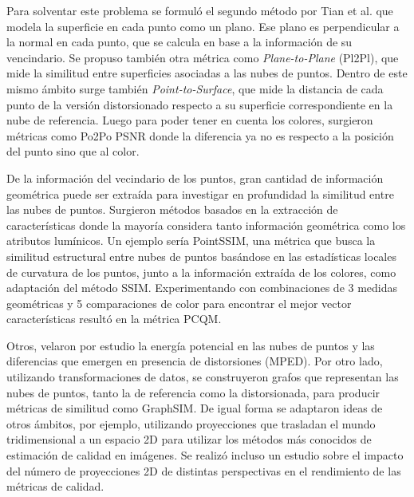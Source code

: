 Para solventar este problema se formuló el segundo método por Tian et al. 
que modela la superficie en cada punto como un plano. 
Ese plano es perpendicular a la normal en cada punto, que se calcula en base a la información de su vencindario. 
Se propuso también otra métrica como \emph{Plane-to-Plane} (Pl2Pl)\cite{PlaneToPlane}, 
que mide la similitud entre superficies asociadas a las nubes de puntos. Dentro 
de este mismo ámbito surge también \emph{Point-to-Surface}\cite{PlaneToSurface}, 
que mide la distancia de cada punto de la versión distorsionado respecto a su 
superficie correspondiente en la nube de referencia. Luego para poder tener en
cuenta los colores, surgieron métricas como Po2Po PSNR donde la diferencia 
ya no es respecto a la posición del punto sino que al color.

De la información del vecindario de los puntos, gran cantidad de información geométrica 
puede ser extraída para investigar en profundidad la similitud entre las nubes 
de puntos. Surgieron métodos basados en la extracción de características donde la 
mayoría considera tanto información geométrica como los atributos lumínicos.
Un ejemplo sería PointSSIM\cite{PointSSIM}, una métrica que busca la similitud estructural entre nubes de puntos basándose en
las estadísticas locales de curvatura de los puntos, junto a la información 
extraída de los colores, como adaptación del método SSIM\cite{SSIM}.
Experimentando con combinaciones de 3 medidas geométricas y 5 comparaciones de color 
para encontrar el mejor vector características resultó en la métrica PCQM\cite{PCQM}.

Otros, velaron por estudio la energía potencial en las nubes de puntos y 
las diferencias que emergen en presencia de distorsiones (MPED)\cite{MPED}.
Por otro lado, utilizando transformaciones de datos, se construyeron grafos que representan 
las nubes de puntos, tanto la de referencia como la distorsionada, 
para producir métricas de similitud como GraphSIM\cite{GraphSIM}.
De igual forma se adaptaron ideas de otros ámbitos, por ejemplo, utilizando 
proyecciones que trasladan el mundo tridimensional a un espacio 2D para utilizar 
los métodos más conocidos de estimación de calidad en imágenes.
Se realizó incluso un estudio sobre el impacto del número de proyecciones 2D de 
distintas perspectivas en el rendimiento de las métricas de calidad\cite{ImpactOf2DProyections, IT-PCQA}.


